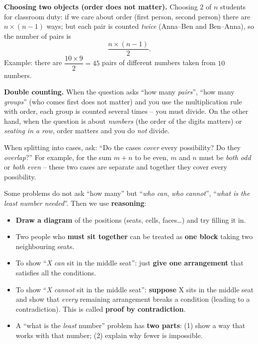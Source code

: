 \begin{knowbox}
\textbf{Choosing two objects (order does not matter).} Choosing $2$ of $n$ students for classroom duty: if we care about order (first person, second person) there are $n\times(n-1)$ ways; but each pair is counted \emph{twice} (Anna--Ben and Ben--Anna), so the number of pairs is
\[
\frac{n\times(n-1)}{2}.
\]
Example: there are $\dfrac{10\times9}{2}=45$ pairs of different numbers taken from $10$ numbers.
\end{knowbox}

\begin{warnbox}
\textbf{Double counting.} When the question asks ``how many \emph{pairs}'', ``how many \emph{groups}'' (who comes first does not matter) and you use the multiplication rule with order, each group is counted several times -- you must divide. On the other hand, when the question is about \emph{numbers} (the order of the digits matters) or \emph{seating in a row}, order matters and you do \emph{not} divide.
\end{warnbox}

\begin{tipbox}
When splitting into cases, ask: ``Do the cases \emph{cover} every possibility? Do they \emph{overlap}?'' For example, for the sum $m+n$ to be even, $m$ and $n$ must be \emph{both odd} or \emph{both even} -- these two cases are separate and together they cover every possibility.
\end{tipbox}

\begin{knowbox}
Some problems do not ask ``how many'' but ``\emph{who can}, \emph{who cannot}'', ``\emph{what is the least number needed}''. Then we use \textbf{reasoning}:
\begin{itemize}[leftmargin=1.2em,itemsep=1pt,topsep=2pt]
\item \textbf{Draw a diagram} of the positions (seats, cells, faces\ldots) and try filling it in.
\item Two people who \textbf{must sit together} can be treated as \textbf{one block} taking two neighbouring seats.
\item To show ``\emph{X can} sit in the middle seat'': just \textbf{give one arrangement} that satisfies all the conditions.
\item To show ``\emph{X cannot} sit in the middle seat'': \textbf{suppose} X sits in the middle seat and show that \emph{every} remaining arrangement breaks a condition (leading to a contradiction). This is called \textbf{proof by contradiction}.
\item A ``what is the \emph{least} number'' problem has \textbf{two parts}: (1) show a way that works with that number; (2) explain why fewer is impossible.
\end{itemize}
\end{knowbox}

